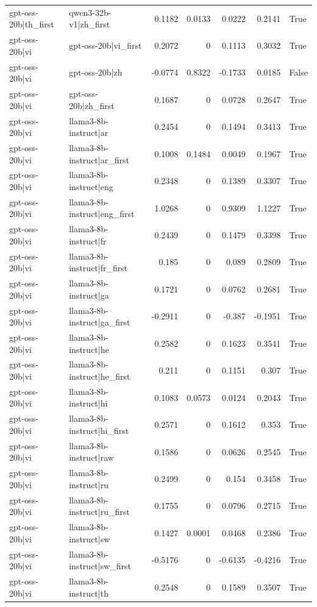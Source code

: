 \begin{table}
\begin{tabular}{l l r r r r l}
gpt-oss-20b|th_first & qwen3-32b-v1|zh_first & 0.1182 & 0.0133 & 0.0222 & 0.2141 & True \\
gpt-oss-20b|vi & gpt-oss-20b|vi_first & 0.2072 & 0 & 0.1113 & 0.3032 & True \\
gpt-oss-20b|vi & gpt-oss-20b|zh & -0.0774 & 0.8322 & -0.1733 & 0.0185 & False \\
gpt-oss-20b|vi & gpt-oss-20b|zh_first & 0.1687 & 0 & 0.0728 & 0.2647 & True \\
gpt-oss-20b|vi & llama3-8b-instruct|ar & 0.2454 & 0 & 0.1494 & 0.3413 & True \\
gpt-oss-20b|vi & llama3-8b-instruct|ar_first & 0.1008 & 0.1484 & 0.0049 & 0.1967 & True \\
gpt-oss-20b|vi & llama3-8b-instruct|eng & 0.2348 & 0 & 0.1389 & 0.3307 & True \\
gpt-oss-20b|vi & llama3-8b-instruct|eng_first & 1.0268 & 0 & 0.9309 & 1.1227 & True \\
gpt-oss-20b|vi & llama3-8b-instruct|fr & 0.2439 & 0 & 0.1479 & 0.3398 & True \\
gpt-oss-20b|vi & llama3-8b-instruct|fr_first & 0.185 & 0 & 0.089 & 0.2809 & True \\
gpt-oss-20b|vi & llama3-8b-instruct|ga & 0.1721 & 0 & 0.0762 & 0.2681 & True \\
gpt-oss-20b|vi & llama3-8b-instruct|ga_first & -0.2911 & 0 & -0.387 & -0.1951 & True \\
gpt-oss-20b|vi & llama3-8b-instruct|he & 0.2582 & 0 & 0.1623 & 0.3541 & True \\
gpt-oss-20b|vi & llama3-8b-instruct|he_first & 0.211 & 0 & 0.1151 & 0.307 & True \\
gpt-oss-20b|vi & llama3-8b-instruct|hi & 0.1083 & 0.0573 & 0.0124 & 0.2043 & True \\
gpt-oss-20b|vi & llama3-8b-instruct|hi_first & 0.2571 & 0 & 0.1612 & 0.353 & True \\
gpt-oss-20b|vi & llama3-8b-instruct|raw & 0.1586 & 0 & 0.0626 & 0.2545 & True \\
gpt-oss-20b|vi & llama3-8b-instruct|ru & 0.2499 & 0 & 0.154 & 0.3458 & True \\
gpt-oss-20b|vi & llama3-8b-instruct|ru_first & 0.1755 & 0 & 0.0796 & 0.2715 & True \\
gpt-oss-20b|vi & llama3-8b-instruct|sw & 0.1427 & 0.0001 & 0.0468 & 0.2386 & True \\
gpt-oss-20b|vi & llama3-8b-instruct|sw_first & -0.5176 & 0 & -0.6135 & -0.4216 & True \\
gpt-oss-20b|vi & llama3-8b-instruct|th & 0.2548 & 0 & 0.1589 & 0.3507 & True \\

\end{tabular}
\end{table}
